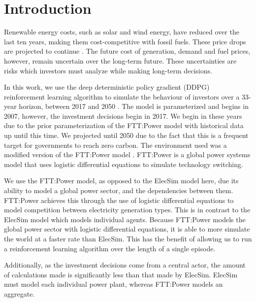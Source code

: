 \section{Introduction}
\label{sec:intro}



Renewable energy costs, such as solar and wind energy, have reduced over the last ten years, making them cost-competitive with fossil fuels. These price drops are projected to continue \cite{IEA2015}. The future cost of generation, demand and fuel prices, however, remain uncertain over the long-term future. These uncertainties are risks which investors must analyze while making long-term decisions.

In this work, we use the deep deterministic policy gradient (DDPG) reinforcement learning algorithm to simulate the behaviour of investors over a 33-year horizon, between 2017 and 2050 \cite{Hunt2016a}. The model is parameterized and begins in 2007, however, the investment decisions begin in 2017. We begin in these years due to the prior parameterization of the FTT:Power model with historical data up until this time. We projected until 2050 due to the fact that this is a frequent target for governments to reach zero carbon. The environment used was a modified version of the FTT:Power model \cite{Mercure2012}. FTT:Power is a global power systems model that uses logistic differential equations to simulate technology switching. 

We use the FTT:Power model, as opposed to the ElecSim model here, due its ability to model a global power sector,  and the dependencies between them. FTT:Power achieves this through the use of logistic differential equations to model competition between electricity generation types. This is in contrast to the ElecSim model which models individual agents. Because FTT:Power models the global power sector with logistic differential equations, it is able to more simulate the world at a faster rate than ElecSim. This has the benefit of allowing us to run a reinforcement learning algorithm over the length of a single episode. 

Additionally, as the investment decisions come from a central actor, the amount of calculations made is significantly less than that made by ElecSim. ElecSim must model each individual power plant, whereas FTT:Power models an aggregate.

